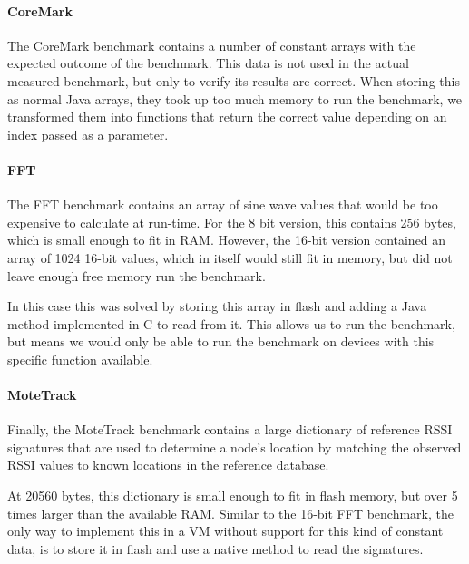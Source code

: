 \paragraph{CoreMark}
The CoreMark benchmark contains a number of constant arrays with the expected outcome of the benchmark. This data is not used in the actual measured benchmark, but only to verify its results are correct. When storing this as normal Java arrays, they took up too much memory to run the benchmark, we transformed them into functions that return the correct value depending on an index passed as a parameter.

\paragraph{FFT}
The FFT benchmark contains an array of sine wave values that would be too expensive to calculate at run-time. For the 8 bit version, this contains 256 bytes, which is small enough to fit in RAM. However, the 16-bit version contained an array of 1024 16-bit values, which in itself would still fit in memory, but did not leave enough free memory run the benchmark.

In this case this was solved by storing this array in flash and adding a Java method implemented in C to read from it. This allows us to run the benchmark, but means we would only be able to run the benchmark on devices with this specific function available.

\paragraph{MoteTrack}
Finally, the MoteTrack benchmark contains a large dictionary of reference RSSI signatures that are used to determine a node's location by matching the observed RSSI values to known locations in the reference database.

At 20560 bytes, this dictionary is small enough to fit in flash memory, but over 5 times larger than the available RAM. Similar to the 16-bit FFT benchmark, the only way to implement this in a VM without support for this kind of constant data, is to store it in flash and use a native method to read the signatures.

% 

